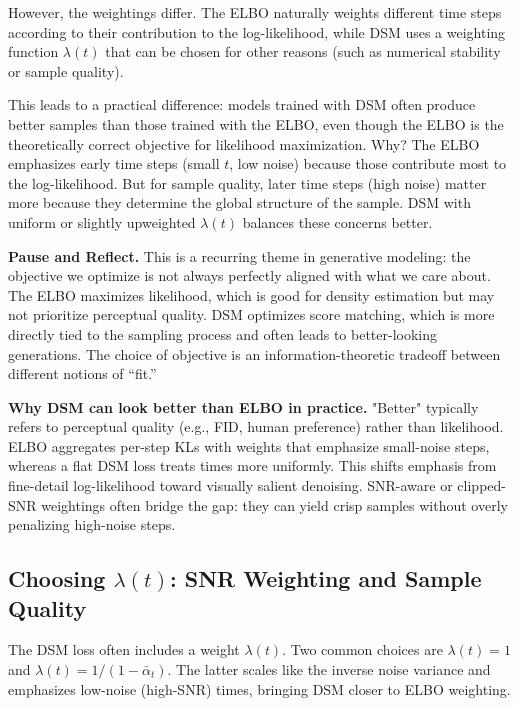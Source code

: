 \vspPara

However, the weightings differ. The ELBO naturally weights different time steps according to their contribution to the log-likelihood, while DSM uses a weighting function $\lambda(t)$ that can be chosen for other reasons (such as numerical stability or sample quality).

\vspPara

This leads to a practical difference: models trained with DSM often produce better samples than those trained with the ELBO, even though the ELBO is the theoretically correct objective for likelihood maximization. Why? The ELBO emphasizes early time steps (small $t$, low noise) because those contribute most to the log-likelihood. But for sample quality, later time steps (high noise) matter more because they determine the global structure of the sample. DSM with uniform or slightly upweighted $\lambda(t)$ balances these concerns better.

\vspSection

\begin{pausebox}
\textbf{Pause and Reflect.} This is a recurring theme in generative modeling: the objective we optimize is not always perfectly aligned with what we care about. The ELBO maximizes likelihood, which is good for density estimation but may not prioritize perceptual quality. DSM optimizes score matching, which is more directly tied to the sampling process and often leads to better-looking generations. The choice of objective is an information-theoretic tradeoff between different notions of ``fit.''
\end{pausebox}

\vspSection


\vspBlock

\vspPara
\textbf{Why DSM can look better than ELBO in practice.} "Better" typically refers to perceptual quality (e.g., FID, human preference) rather than likelihood. ELBO aggregates per-step KLs with weights that emphasize small-noise steps, whereas a flat DSM loss treats times more uniformly. This shifts emphasis from fine-detail log-likelihood toward visually salient denoising. SNR-aware or clipped-SNR weightings often bridge the gap: they can yield crisp samples without overly penalizing high-noise steps.
\subsection{Choosing \texorpdfstring{$\lambda(t)$}{lambda(t)}: SNR Weighting and Sample Quality}
The DSM loss often includes a weight $\lambda(t)$. Two common choices are $\lambda(t)=1$ and $\lambda(t)=1/(1-\bar{\alpha}_t)$. The latter scales like the inverse noise variance and emphasizes low-noise (high-SNR) times, bringing DSM closer to ELBO weighting.

